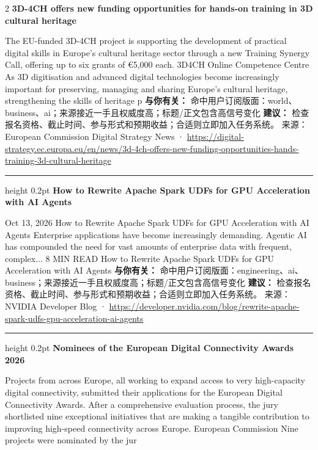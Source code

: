 \documentclass[10.5pt]{ctexart}
\begin{document}
\begin{multicols}{2}
{\large\bfseries 3D-4CH offers new funding opportunities for hands-on training in 3D cultural heritage}\par
The EU-funded 3D-4CH project is supporting the development of practical digital skills in Europe's cultural heritage sector through a new Training Synergy Call, offering up to six grants of €5,000 each. 3D4CH Online Competence Centre As 3D digitisation and advanced digital technologies become increasingly important for preserving, managing and sharing Europe's cultural heritage, strengthening the skills of heritage p
\textbf{与你有关：} 命中用户订阅版面：world、business、ai；来源接近一手且权威度高；标题/正文包含高信号变化
\textbf{建议：} 检查报名资格、截止时间、参与形式和预期收益；合适则立即加入任务系统。
{\footnotesize\color{ormuted} 来源：European Commission Digital Strategy News · \url{https://digital-strategy.ec.europa.eu/en/news/3d-4ch-offers-new-funding-opportunities-hands-training-3d-cultural-heritage}}
\vspace{2mm}
\hrule height 0.2pt
\vspace{2mm}
{\large\bfseries How to Rewrite Apache Spark UDFs for GPU Acceleration with AI Agents}\par
Oct 13, 2026 How to Rewrite Apache Spark UDFs for GPU Acceleration with AI Agents Enterprise applications have become increasingly demanding. Agentic AI has compounded the need for vast amounts of enterprise data with frequent, complex... 8 MIN READ How to Rewrite Apache Spark UDFs for GPU Acceleration with AI Agents
\textbf{与你有关：} 命中用户订阅版面：engineering、ai、business；来源接近一手且权威度高；标题/正文包含高信号变化
\textbf{建议：} 检查报名资格、截止时间、参与形式和预期收益；合适则立即加入任务系统。
{\footnotesize\color{ormuted} 来源：NVIDIA Developer Blog · \url{https://developer.nvidia.com/blog/rewrite-apache-spark-udfs-gpu-acceleration-ai-agents}}
\vspace{2mm}
\hrule height 0.2pt
\vspace{2mm}
{\large\bfseries Nominees of the European Digital Connectivity Awards 2026}\par
Projects from across Europe, all working to expand access to very high-capacity digital connectivity, submitted their applications for the European Digital Connectivity Awards. After a comprehensive evaluation process, the jury shortlisted nine exceptional initiatives that are making a tangible contribution to improving high-speed connectivity across Europe. European Commission Nine projects were nominated by the jur

\end{multicols}
\end{document}
